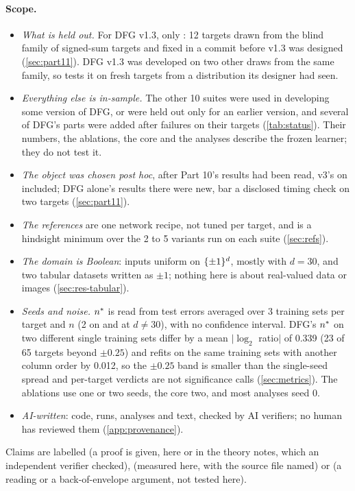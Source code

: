 \paragraph{Scope.}
\begin{itemize}
\item \emph{What is held out.} For DFG v1.3, only : 12 targets drawn from the blind family of signed-sum targets and fixed in a commit before v1.3 was designed (\cref{sec:part11}). DFG v1.3 was developed on two other draws from the same family, so  tests it on fresh targets from a distribution its designer had seen.
\item \emph{Everything else is in-sample.} The other 10 suites were used in developing some version of DFG, or were held out only for an earlier version, and several of DFG's parts were added after failures on their targets (\cref{tab:status}). Their numbers, the ablations, the core and the analyses describe the frozen learner; they do not test it.
\item \emph{The object was chosen post hoc}, after Part 10's results had been read, v3's on  included; DFG alone's results there were new, bar a disclosed timing check on two targets (\cref{sec:part11}).
\item \emph{The references} are one network recipe, not tuned per target, and  is a hindsight minimum over the 2 to 5 variants run on each suite (\cref{sec:refs}).
\item \emph{The domain is Boolean}: inputs uniform on $\{\pm1\}^d$, mostly with $d=30$, and two tabular datasets written as $\pm1$; nothing here is about real-valued data or images (\cref{sec:res-tabular}).
\item \emph{Seeds and noise.} $n^{*}$ is read from test errors averaged over 3 training sets per target and $n$ (2 on  and at $d\ne30$), with no confidence interval. DFG's $n^{*}$ on two different single training sets differ by a mean $|\log_2$ ratio$|$ of 0.339 (23 of 65 targets beyond $\pm0.25$) and refits on the same training sets with another column order by 0.012, so the $\pm0.25$ band is smaller than the single-seed spread and per-target verdicts are not significance calls (\cref{sec:metrics}). The ablations use one or two seeds, the core two, and most analyses seed 0.
\item \emph{AI-written}: code, runs, analyses and text, checked by AI verifiers; no human has reviewed them (\cref{app:provenance}).
\end{itemize}
Claims are labelled  (a proof is given, here or in the theory notes, which an independent verifier checked),  (measured here, with the source file named) or  (a reading or a back-of-envelope argument, not tested here).

